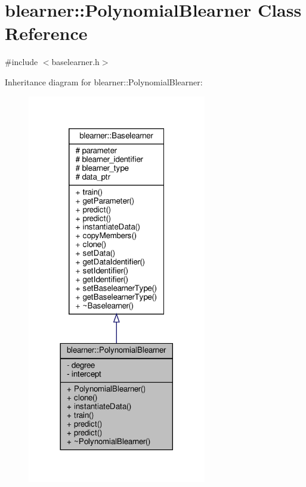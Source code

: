 \hypertarget{classblearner_1_1_polynomial_blearner}{}\section{blearner\+:\+:Polynomial\+Blearner Class Reference}
\label{classblearner_1_1_polynomial_blearner}


{\ttfamily \#include $<$baselearner.\+h$>$}



Inheritance diagram for blearner\+:\+:Polynomial\+Blearner\+:\nopagebreak
\begin{figure}[H]
\begin{center}
\leavevmode
\includegraphics[width=221pt]{classblearner_1_1_polynomial_blearner__inherit__graph}
\end{center}
\end{figure}


